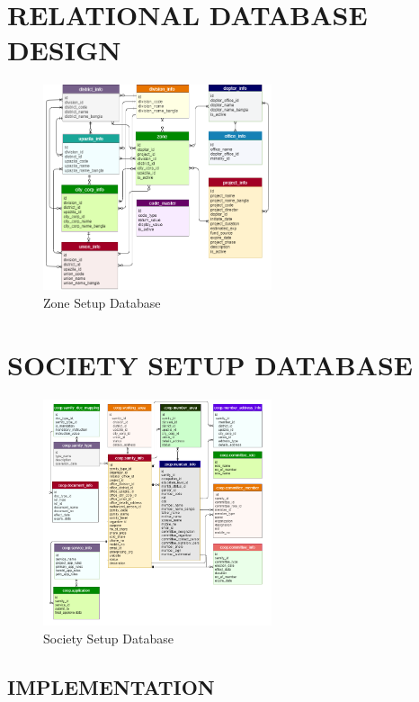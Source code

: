 \section{RELATIONAL DATABASE DESIGN}
\begin{figure}[h]
  \centering
  \includegraphics[width=0.6\textwidth]{Chap3/6.png}
  \caption{Zone Setup Database}
  \label{fig:example}
\end{figure}

\section{SOCIETY SETUP DATABASE}
\begin{figure}[h]
  \centering
  \includegraphics[width=0.6\textwidth]{Chap3/7.png}
  \caption{Society Setup Database}
  \label{fig:example}
\end{figure}



\subsection{IMPLEMENTATION}

